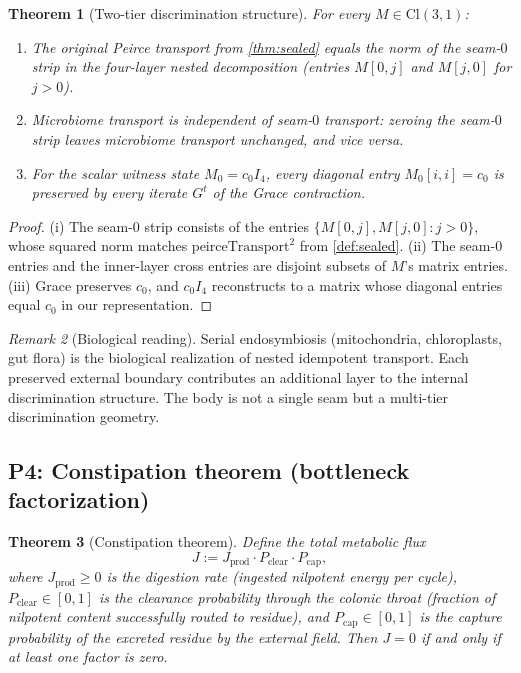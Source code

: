 \documentclass[11pt,a4paper]{article}
\theoremstyle{plain}
\newtheorem{theorem}{Theorem}[section]
\theoremstyle{definition}
\theoremstyle{remark}
\newtheorem{remark}[theorem]{Remark}
\numberwithin{equation}{section}
\providecommand{\Cl}{\mathrm{Cl}}
\begin{document}
\begin{theorem}[Two-tier discrimination structure]
\label{thm:microbiome}
For every $M \in \Cl(3,1)$:
\begin{enumerate}[label=(\roman*)]
\item The original Peirce transport from \cref{thm:sealed} equals
  the norm of the seam-$0$ strip in the four-layer nested
  decomposition (entries $M[0,j]$ and $M[j,0]$ for $j > 0$).
\item Microbiome transport is independent of seam-$0$ transport:
  zeroing the seam-$0$ strip leaves microbiome transport unchanged,
  and vice versa.
\item For the scalar witness state $M_0 = c_0 I_4$, every diagonal
  entry $M_0[i,i] = c_0$ is preserved by every iterate $G^t$ of the
  Grace contraction.
\end{enumerate}
\end{theorem}

\begin{proof}
(i) The seam-$0$ strip consists of the entries $\{M[0,j], M[j,0] : j > 0\}$,
whose squared norm matches $\mathrm{peirceTransport}^2$ from
\cref{def:sealed}.
(ii) The seam-$0$ entries and the inner-layer cross entries
are disjoint subsets of $M$'s matrix entries.
(iii) Grace preserves $c_0$, and $c_0 I_4$ reconstructs to a
matrix whose diagonal entries equal $c_0$ in our representation.
\end{proof}

\begin{remark}[Biological reading]
Serial endosymbiosis (mitochondria, chloroplasts, gut flora) is the
biological realization of nested idempotent transport. Each
preserved external boundary contributes an additional layer to the
internal discrimination structure. The body is not a single seam
but a multi-tier discrimination geometry.
\end{remark}

\subsection{P4: Constipation theorem (bottleneck factorization)}

\begin{theorem}[Constipation theorem]
\label{thm:constipation}
Define the \emph{total metabolic flux}
\[
J := J_\mathrm{prod} \cdot P_\mathrm{clear} \cdot P_\mathrm{cap},
\]
where $J_\mathrm{prod} \ge 0$ is the digestion rate (ingested
nilpotent energy per cycle), $P_\mathrm{clear} \in [0, 1]$ is the
clearance probability through the colonic throat (fraction of
nilpotent content successfully routed to residue), and
$P_\mathrm{cap} \in [0, 1]$ is the capture probability of the
excreted residue by the external field. Then $J = 0$ if and only if
at least one factor is zero.
\end{theorem}
\end{document}
